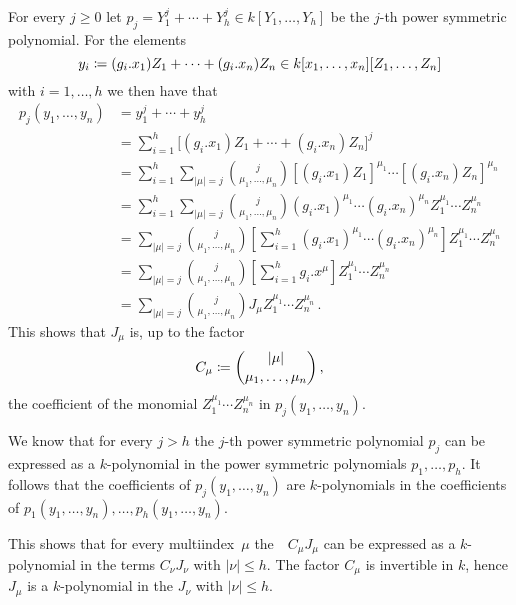 For every $j \geq 0$ let $p_j = Y_1^j + \dotsb + Y_h^j \in k[Y_1, \dotsc, Y_h]$ be the $j$-th power symmetric polynomial.
For the elements
\[
            y_i
  \coloneqq  (g_i.x_1) Z_1 + \dotsb + (g_i.x_n) Z_n
  \in       k[x_1, \dotsc, x_n][Z_1, \dotsc, Z_n]
\]
with $i = 1, \dotsc, h$ we then have that
\begingroup
\allowdisplaybreaks
\begin{align*}
      p_j(y_1, \dotsc, y_n)
  &=  y_1^j + \dotsb + y_h^j  \\
  &=  \sum_{i=1}^h \bigl[ (g_i.x_1) Z_1 + \dotsb + (g_i.x_n) Z_n \bigr]^j  \\
  &=  \sum_{i=1}^h \sum_{|\mu| = j}
      \binom{j}{\mu_1, \dotsc, \mu_n} [(g_i.x_1) Z_1]^{\mu_1} \dotsm [(g_i.x_n) Z_n]^{\mu_n}  \\
  &=  \sum_{i=1}^h \sum_{|\mu| = j}
      \binom{j}{\mu_1, \dotsc, \mu_n} (g_i.x_1)^{\mu_1} \dotsm (g_i.x_n)^{\mu_n} Z_1^{\mu_1} \dotsm Z_n^{\mu_n} \\
  &=  \sum_{|\mu| = j} \binom{j}{\mu_1, \dotsc, \mu_n}
      \left[
        \sum_{i=1}^h (g_i.x_1)^{\mu_1} \dotsm (g_i.x_n)^{\mu_n}
      \right]
      Z_1^{\mu_1} \dotsm Z_n^{\mu_n}  \\
  &=  \sum_{|\mu| = j} \binom{j}{\mu_1, \dotsc, \mu_n}
      \left[
        \sum_{i=1}^h g_i.x^\mu
      \right]
      Z_1^{\mu_1} \dotsm Z_n^{\mu_n}  \\
  &=  \sum_{|\mu| = j} \binom{j}{\mu_1, \dotsc, \mu_n} J_\mu Z_1^{\mu_1} \dotsm Z_n^{\mu_n} \,.
\end{align*}
\endgroup
This shows that $J_\mu$ is, up to the factor
\[
            C_\mu
  \coloneqq  \binom{|\mu|}{\mu_1, \dotsc, \mu_n} \,,
\]
the coefficient of the monomial $Z_1^{\mu_1} \dotsm Z_n^{\mu_n}$ in $p_j(y_1, \dotsc, y_n)$.

We know that for every $j > h$ the $j$-th power symmetric polynomial $p_j$ can be expressed as a $k$-polynomial in the power symmetric polynomials $p_1, \dotsc, p_h$.
It follows that the coefficients of $p_j(y_1, \dotsc, y_n)$ are $k$-polynomials in the coefficients of $p_1(y_1, \dotsc, y_n), \dotsc, p_h(y_1, \dotsc, y_n)$.

This shows that for every multiindex~$\mu$ the~~$C_\mu J_\mu$ can be expressed as a $k$-polynomial in the terms $C_\nu J_\nu$ with $|\nu| \leq h$.
The factor $C_\mu$ is invertible in $k$, hence $J_\mu$ is a $k$-polynomial in the $J_\nu$ with $|\nu| \leq h$.



